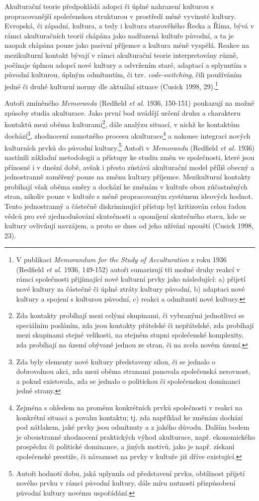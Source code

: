 Akulturační teorie předpokládá adopci či úplné nahrazení kulturou s propracovanější společenskou strukturou v prostředí méně vyvinuté kultury. Evropská, či západní, kultura, a tedy i kultura starověkého Řecka a Říma, bývá v rámci akulturačních teorií chápána jako nadřazená kultuře původní, a ta je naopak chápána pouze jako pasivní příjemce a kultura méně vyspělá. Reakce na mezikulturní kontakt bývají v rámci akulturační teorie interpretovány různě, počínaje úplnou adopcí nové kultury a odvržením staré, adaptací a splynutím s původní kulturou, úplným odmítnutím, či tzv. {\em code-switching}, čili používáním jedné či druhé kulturní normy dle aktuální situace (Cusick 1998, 29).\footnote{V publikaci {\em Memorandum for the Study of Acculturation} z roku 1936 (Redfield {\em et al.} 1936, 149-152) autoři sumarizují tři možné druhy reakcí v rámci společnosti přijímající nové kulturní prvky jako následující: a) přijetí nové kultury za částečné či úplné ztráty kultury původní, b) adaptaci nové kultury a spojení s kulturou původní, c) reakci a odmítnutí nové kultury.}

Autoři zmíněného {\em Memoranda} (Redfield {\em et al.} 1936, 150-151) poukazují na možné způsoby studia akulturace. Jako první bod uvádějí určení druhu a charakteru kontaktů mezi oběma kulturami\footnote{Zda kontakty probíhají mezi celými skupinami, či vybranými jednotlivci se speciálním posláním, zda jsou kontakty přátelské či nepřátelské, zda probíhají mezi skupinami stejné velikosti, na stejném stupni společenské komplexity, zda probíhají na území obývané jednou ze stran, či na zcela novém území.}, dále analýzu situací, v nichž ke kontaktům dochází\footnote{Zda byly elementy nové kultury představeny silou, či se jednalo o dobrovolnou akci, zda mezi oběma stranami panovala společenská nerovnost, a pokud existovala, zda se jednalo o politickou či společenskou dominanci jedné strany.}, zhodnocení samotného procesu akulturace\footnote{Zejména s ohledem na proměnu konkrétních prvků společnosti v reakci na konkrétní situaci a povahu kontaktu; tj. zda například ke změnám dochází pod nátlakem, jaké prvky jsou odmítnuty a z jakého důvodu. Dalším bodem je oboustranné zhodnocení praktických výhod akulturace, např. ekonomického prospěchu či politické dominance, a jiných motivů, jako je např. získaní společenské prestiže, či návaznost na prvky v kultuře již dříve existující.} a nakonec integraci nových kulturních prvků do původní kultury.\footnote{Autoři hodnotí dobu, jaká uplynula od představení prvku, obtížnost přijetí nového prvku v rámci původní kultury, dále míru nutnosti přizpůsobení původní kultury novému uspořádání.} Autoři v {\em Memorandu} (Redfield {\em et al.} 1936) nastínili základní metodologii a přístupy ke studiu změn ve společnosti, které jsou přínosné i v dnešní době, avšak i přesto zůstává akulturační model příliš obecný a jednostranně zaměřený pouze na změnu kultury příjemce. Mezikulturní kontakty probíhají však oběma směry a dochází ke změnám v kultuře obou zúčastněných stran, nikoliv pouze v kultuře s méně propracovaným systémem ideových hodnot. Tento jednostranný a částečně diskriminující přístup byl kritizován celou řadou vědců pro své zjednodušování skutečnosti a opomíjení skutečného stavu, kde se kultury ovlivňují navzájem, a proto se dnes od jeho užívání upouští (Cusick 1998, 23).

